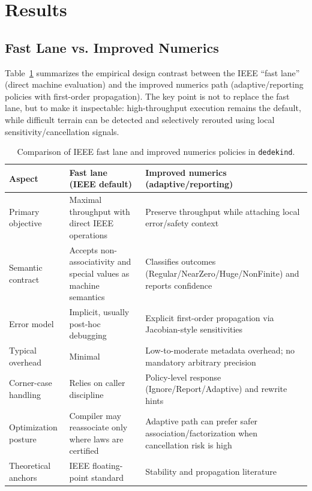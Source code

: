 \documentclass[11pt, a4paper]{report}
\begin{document}
\section{Results}
\label{sec:ieee-results}

\subsection{Fast Lane vs. Improved Numerics}

Table~\ref{tab:fastlane_vs_improved} summarizes the empirical design contrast
between the IEEE ``fast lane'' (direct machine evaluation) and the improved
numerics path (adaptive/reporting policies with first-order propagation).
The key point is not to replace the fast lane, but to make it inspectable:
high-throughput execution remains the default, while difficult terrain can be
detected and selectively rerouted using local sensitivity/cancellation signals.

\begin{table}[ht]
\centering
\caption{Comparison of IEEE fast lane and improved numerics policies in \texttt{dedekind}.}
\label{tab:fastlane_vs_improved}
\begin{tabular}{p{3.0cm}p{5.1cm}p{5.1cm}}
\toprule
\textbf{Aspect} & \textbf{Fast lane (IEEE default)} & \textbf{Improved numerics (adaptive/reporting)} \\
\midrule
Primary objective & Maximal throughput with direct IEEE operations & Preserve throughput while attaching local error/safety context \\
Semantic contract & Accepts non-associativity and special values as machine semantics & Classifies outcomes (Regular/NearZero/Huge/NonFinite) and reports confidence \\
Error model & Implicit, usually post-hoc debugging & Explicit first-order propagation via Jacobian-style sensitivities \\
Typical overhead & Minimal & Low-to-moderate metadata overhead; no mandatory arbitrary precision \\
Corner-case handling & Relies on caller discipline & Policy-level response (Ignore/Report/Adaptive) and rewrite hints \\
Optimization posture & Compiler may reassociate only where laws are certified & Adaptive path can prefer safer association/factorization when cancellation risk is high \\
Theoretical anchors & IEEE floating-point standard \cite{ieee754_2019} & Stability and propagation literature \cite{higham2002accuracy, ku1966notes, goodman1960exact, ogita2005accurate} \\
\bottomrule
\end{tabular}
\end{table}
\end{document}
